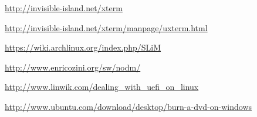 \documentclass[12pt,a4paper]{book}
\begin{document}
\begin{thebibliography}{1}
\url{http://invisible-island.net/xterm}

\url{http://invisible-island.net/xterm/manpage/uxterm.html}
			
\url{https://wiki.archlinux.org/index.php/SLiM}


\url{http://www.enricozini.org/sw/nodm/}	

\url{http://www.linwik.com/dealing_with_uefi_on_linux}	

\url{http://www.ubuntu.com/download/desktop/burn-a-dvd-on-windows}	
		
\end{thebibliography}


\newpage

\printindex

\newpage
\end{document}

